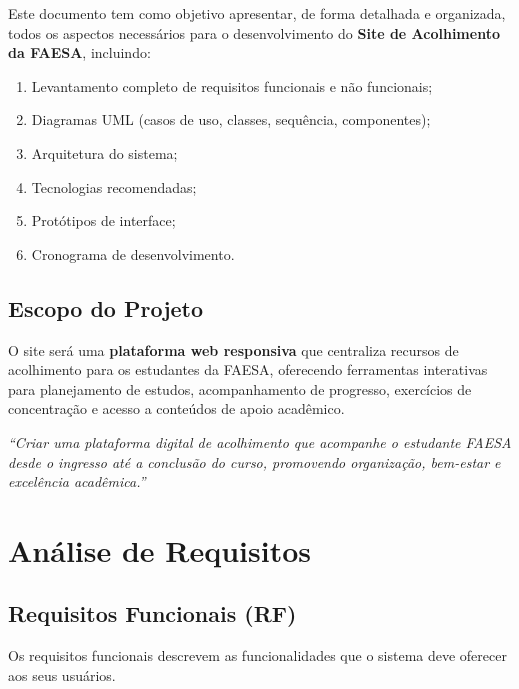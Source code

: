 \documentclass[12pt, a4paper]{article}
\begin{document}
Este documento tem como objetivo apresentar, de forma detalhada e organizada, todos os aspectos necessários para o desenvolvimento do \textbf{Site de Acolhimento da FAESA}, incluindo:

\begin{enumerate}[leftmargin=2cm]
    \item Levantamento completo de requisitos funcionais e não funcionais;
    \item Diagramas UML (casos de uso, classes, sequência, componentes);
    \item Arquitetura do sistema;
    \item Tecnologias recomendadas;
    \item Protótipos de interface;
    \item Cronograma de desenvolvimento.
\end{enumerate}

\subsection{Escopo do Projeto}

O site será uma \textbf{plataforma web responsiva} que centraliza recursos de acolhimento para os estudantes da FAESA, oferecendo ferramentas interativas para planejamento de estudos, acompanhamento de progresso, exercícios de concentração e acesso a conteúdos de apoio acadêmico.

\begin{destaque}
    \textit{``Criar uma plataforma digital de acolhimento que acompanhe o estudante FAESA desde o ingresso até a conclusão do curso, promovendo organização, bem-estar e excelência acadêmica.''}
\end{destaque}

\newpage
\section{Análise de Requisitos}

\subsection{Requisitos Funcionais (RF)}

Os requisitos funcionais descrevem as funcionalidades que o sistema deve oferecer aos seus usuários.
\end{document}
